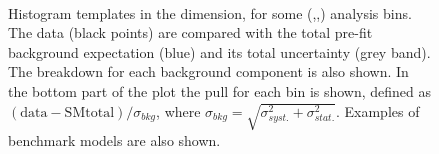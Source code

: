 \clearpage


\clearpage


\clearpage


\clearpage
\begin{figure}[tbhp]
    \caption{ 
    Histogram templates in the \mht dimension, for some (\njet,\nb,\scalht) analysis bins. 
    The data (black points) are compared with the total pre-fit background expectation (blue) and its total uncertainty (grey band). 
    The breakdown for each background component is also shown. 
    In the bottom part of the plot the pull for each bin is shown, defined as $(\mathrm{data}-\mathrm{SM total})/\sigma_{bkg}$, where $\sigma_{bkg}=\sqrt{\sigma^{2}_{syst.}+\sigma^{2}_{stat.}}$. 
    Examples of benchmark models are also shown. \label{fig:mht-templates} }
  \begin{center}
     ~~

\end{center}
\end{figure}

